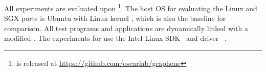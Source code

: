 All experiments are evaluated upon \graphene{} \grapheneversion{}\footnote{\graphene{} is released at \url{https://github.com/oscarlab/graphene}}.
The host OS for evaluating the Linux and SGX ports is Ubuntu \ubuntuversion with Linux kernel \linuxversion{},
which is also the baseline for comparison.
All test programs and applications are dynamically linked
with a modified \glibc{} \glibcversion{}.
The experiments for \graphenesgx{}
use the Intel \sgx{} Linux SDK~\cite{intel-sgx-linux-sdk} and driver~\cite{intel-sgx-linux-driver} \sgxdriverversion{}.